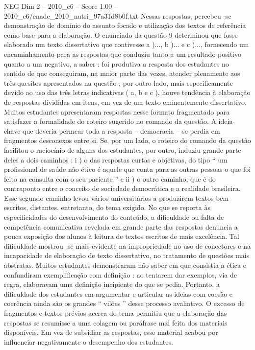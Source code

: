 \begin{textsample}{NEG Dim 2 – 2010\_c6 – Score 1.00 – 2010\_c6/enade\_2010\_nutri\_97a31d8b0f.txt}
Nessas respostas, percebeu -se demonstração de domínio do assunto focado e utilização dos textos de referência como base para a elaboração.
O enunciado da questão 9 determinou que fosse elaborado um texto dissertativo que contivesse a )..., b )... e c )..., fornecendo um encaminhamento para as respostas que conduziu tanto a um resultado positivo quanto a um negativo, a saber : foi produtiva a resposta dos estudantes no sentido de que conseguiram, na maior parte das vezes, atender plenamente aos três quesitos apresentados na questão ; por outro lado, mais especificamente devido ao uso das três letras indicativas ( a, b e c ), houve tendência à elaboração de respostas divididas em itens, em vez de um texto eminentemente dissertativo.
Muitos estudantes apresentaram respostas nesse formato fragmentado para satisfazer a formalidade do roteiro sugerido no comando da questão.
A ideia-chave que deveria permear toda a resposta – democracia – se perdia em fragmentos desconexos entre si.
Se, por um lado, o roteiro do comando da questão facilitou o raciocínio de alguns dos estudantes, por outro, induziu grande parte deles a dois caminhos : i ) o das respostas curtas e objetivas, do tipo “ um profissional de saúde não ético é aquele que conta para as outras pessoas o que foi feito na consulta com o seu paciente ” e ii ) o outro caminho, que é do contraponto entre o conceito de sociedade democrática e a realidade brasileira.
Esse segundo caminho levou vários universitários a produzirem textos bem escritos, distantes, entretanto, do tema exigido.
No que se reporta às especificidades do desenvolvimento do conteúdo, a dificuldade ou falta de competência comunicativa revelada em grande parte das respostas denuncia a pouca exposição dos alunos à leitura de textos escritos de mais excelência.
Tal dificuldade mostrou -se mais evidente na impropriedade no uso de conectores e na incapacidade de elaboração de texto dissertativo, no tratamento de questões mais abstratas.
Muitos estudantes demonstraram não saber em que consistia a ética e confundiram exemplificação com definição : ao tentarem dar exemplos, via de regra, elaboravam uma definição incipiente do que se pedia.
Portanto, a dificuldade dos estudantes em argumentar e articular as ideias com coesão e coerência ainda são os grandes “ vilões ” desse processo avaliativo.
O excesso de fragmentos e textos prévios acerca do tema permitiu que a elaboração das respostas se resumisse a uma colagem ou paráfrase mal feita dos materiais disponíveis.
Em vez de subsidiar as respostas, esse material acabou por influenciar negativamente o desempenho dos estudantes.

\end{textsample}
